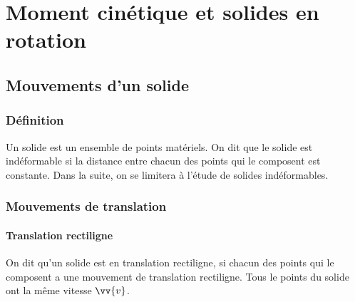 \documentclass{cours}
\begin{document}
\setcounter{chapter}{13}
\chapter{Moment cinétique et solides en rotation}
\section{Mouvements d'un solide}%
\label{sec:mouvements_d_un_solide}

\subsection{Définition}%
\label{sub:definition}

\begin{definition}
  Un solide est un ensemble de points matériels. On dit que le solide est indéformable si la distance entre chacun des points qui le composent est constante. Dans la suite, on se limitera à l'étude de solides indéformables.
\end{definition}

\subsection{Mouvements de translation}%
\label{sub:mouvements_de_translation}

\subsubsection{Translation rectiligne}%
\label{ssub:translation_rectiligne}

\begin{definition}
  On dit qu'un solide est en translation rectiligne, si chacun des points qui le composent a une mouvement de translation rectiligne. Tous le points du solide ont la même vitesse $\vv{v}$. 
\end{definition}

  \newcommand{\objet}[1]{
    \draw[thick, fill=white, fill opacity=0.8] #1 to[out=180, in=-90] ++(-1, 2) to[out=90, in=180] ++(1,1) to[out=0, in=90] ++(2,-1) to[out=-90, in=0] ++(-1,-1) to[out=180, in=0] ++(-1,-1);
    \draw[fill=black] ($#1+(0, 0.5)$) circle(2pt);
    \draw[fill=black] ($#1+(-0.5, 1.5)$) circle(2pt);
    \draw[fill=black] ($#1+(1.5, 2)$) circle(2pt);
    }

\begin{center}
\end{center}
\end{document}
